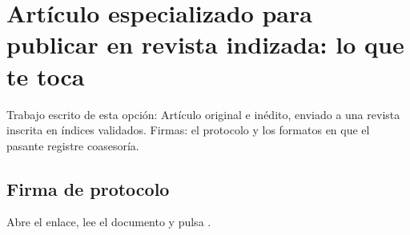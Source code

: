 \section{Artículo especializado para publicar en revista indizada: lo que te toca}
Trabajo escrito de esta opción: Artículo original e inédito, enviado a una revista inscrita en índices validados. Firmas: el protocolo y los formatos en que el pasante registre coasesoría.
\subsection{Firma de protocolo}
Abre el enlace, lee el documento y pulsa .
